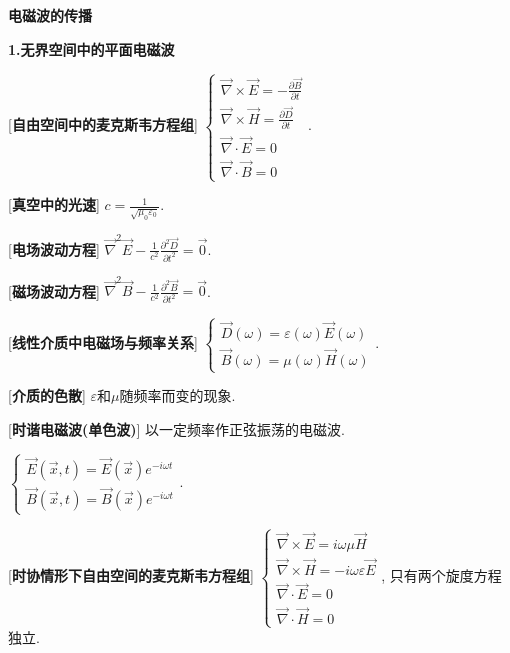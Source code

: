


 \begin{center} 
 \Large \textbf{电磁波的传播}
\end{center}
 
\large 
\begin{center}
 \textbf{1.无界空间中的平面电磁波}
\end{center}

[\textbf{自由空间中的麦克斯韦方程组}] $\begin{cases}\vec\nabla\times\vec E=-\frac{\partial \vec B}{\partial t}\\ \vec\nabla\times\vec H=\frac{\partial\vec D}{\partial t}\\ \vec\nabla\cdot\vec E=0\\\vec\nabla\cdot\vec B=0 \end{cases}$.\par

[\textbf{真空中的光速}] $c=\frac{1}{\sqrt{\mu_0\varepsilon_0}}$.\par

[\textbf{电场波动方程}] $\vec\nabla^2\vec E-\frac{1}{c^2}\frac{\partial^2\vec D}{\partial t^2}=\vec 0$.\par

[\textbf{磁场波动方程}] $\vec\nabla^2\vec B-\frac{1}{c^2}\frac{\partial^2\vec B}{\partial t^2}=\vec 0$.\par

[\textbf{线性介质中电磁场与频率关系}] $\begin{cases}\vec D(\omega)=\varepsilon (\omega)\vec E(\omega)\\\vec B(\omega)=\mu (\omega)\vec H(\omega)\end{cases}$.\par

[\textbf{介质的色散}] $\varepsilon$和$\mu$随频率而变的现象.\par

[\textbf{时谐电磁波(单色波)}] 以一定频率作正弦振荡的电磁波.\par
\qquad $\begin{cases}\vec E(\vec x,t)=\vec E(\vec x)e^{-i\omega t}\\\vec B(\vec x,t)=\vec B(\vec x)e^{-i\omega t}\end{cases}$.\par

[\textbf{时协情形下自由空间的麦克斯韦方程组}] $\begin{cases}\vec\nabla\times\vec E=i\omega\mu\vec H\\\vec\nabla\times\vec H=-i\omega\varepsilon\vec E\\\vec\nabla\cdot\vec E=0\\\vec\nabla\cdot\vec H=0\end{cases}$, 只有两个旋度方程独立.\par

